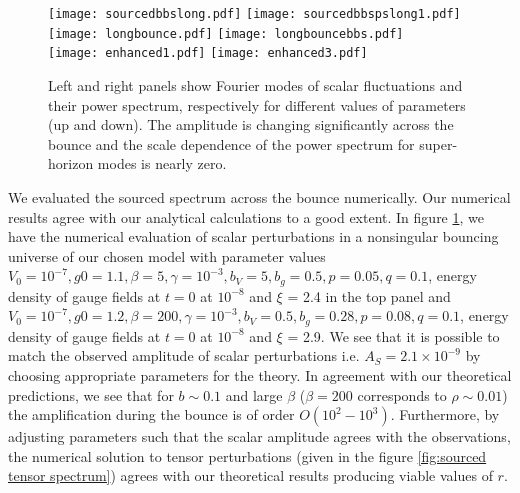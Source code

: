 \documentclass[12pt,a4paper]{article}
\numberwithin{equation}{section}
\numberwithin{equation}{section}
\begin{document}
\begin{figure}[H]
    \centering
    \texttt{[image: sourcedbbslong.pdf]} 
    \hspace{0.5cm}
     \texttt{[image: sourcedbbspslong1.pdf]} 
     \\
       \texttt{[image: longbounce.pdf]} 
    \hspace{0.5cm}
     \texttt{[image: longbouncebbs.pdf]} 
     \\
      \texttt{[image: enhanced1.pdf]} 
    \hspace{0.5cm}
     \texttt{[image: enhanced3.pdf]} 
     \caption{Left and right panels show Fourier modes of scalar fluctuations and their power spectrum, respectively for different values of parameters (up and down). 
     The amplitude is changing significantly across the bounce and the scale dependence of the power spectrum for super-horizon modes is nearly zero.} 
\label{fig:sourced scalar spectrum}
\end{figure}
We evaluated the sourced spectrum across the bounce numerically. Our numerical results agree with our analytical calculations to a good extent. 
In figure \ref{fig:sourced scalar spectrum}, we have the numerical evaluation of scalar perturbations in a nonsingular bouncing universe of our chosen model with  parameter values 
$V_0 = 10^{-7},g0 = 1.1,\beta = 5,\gamma = 10^{-3},b_V = 5,
b_g = 0.5, p = 0.05 ,q = 0.1$, energy density of gauge fields at $t=0$ at $10^{-8}$ and $\xi$ = 2.4 in the top panel and $V_0 = 10^{-7},g0 = 1.2,\beta = 200,\gamma = 10^{-3},b_V = 0.5,
b_g = 0.28, p = 0.08 ,q = 0.1$, energy density of gauge fields at $t=0$ at $10^{-8}$ and $\xi$ = 2.9. We see that it is possible to match the observed amplitude of scalar perturbations i.e. $A_S = 2.1 \times 10^{-9}$ by choosing appropriate parameters for the theory. In agreement with our theoretical predictions, we see that for $b \sim 0.1$ and large $\beta$ ($\beta=200$ corresponds to $\rho \sim 0.01$) the amplification during the bounce is of order $O(10^2-10^3)$. Furthermore, by adjusting parameters such that the scalar amplitude agrees with the observations, the numerical solution to tensor perturbations (given in the figure \ref{fig:sourced tensor spectrum}) agrees with our theoretical results producing viable values of $r$.
\end{document}
